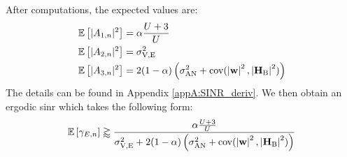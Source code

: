 After computations, the expected values are:
\begin{equation}
    \begin{split}
        &\mathbb{E} \left[|A_{1,n}|^2\right] = \alpha \frac{U+3}{U} \\
        &\mathbb{E} \left[|A_{2,n}|^2\right] = \sigma^2_{\text{V,E}}\\
        &\mathbb{E} \left[|A_{3,n}|^2\right] = 2(1-\alpha) \left( \sigma^2_{\text{AN}} + \text{cov}(\left|\textbf{w}\right|^2,\left|\textbf{H}_\text{B}\right|^2) \right)
    \end{split}
    \label{eq:expected_eve_filt1}
\end{equation}
The details can be found in Appendix  \ref{appA:SINR_deriv}. We then obtain an ergodic \gls{sinr} which takes the following form:
\begin{equation}
    \mathbb{E} \left[\gamma_{E,n}\right] \gtrapprox \frac{\alpha \frac{U+3}{U}}{\sigma^2_{\text{V,E}} + 2(1-\alpha) \left( \sigma^2_{\text{AN}} + \text{cov}(\left|\textbf{w}\right|^2,\left|\textbf{H}_\text{B}\right|^2) \right)}
    \label{eq:sinr_eve_filt1}
\end{equation}

